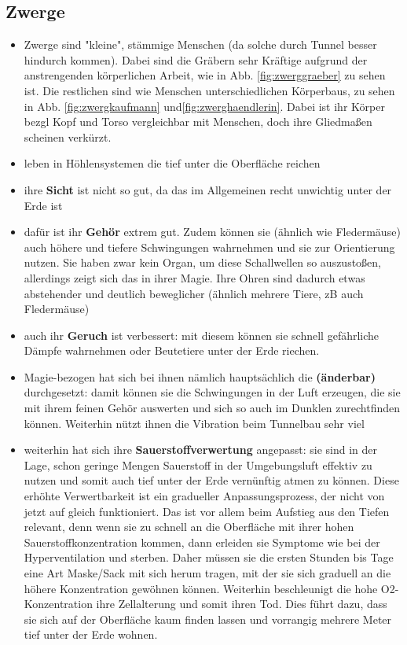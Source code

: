 \subsection{Zwerge} \label{rasse:zwerge}
\begin{itemize}
	\item  Zwerge sind "kleine", stämmige Menschen (da solche durch Tunnel besser hindurch kommen). Dabei sind die Gräbern sehr Kräftige aufgrund der anstrengenden körperlichen Arbeit, wie in Abb. \ref{fig:zwerggraeber} zu sehen ist. Die restlichen sind wie Menschen unterschiedlichen Körperbaus, zu sehen in Abb. \ref{fig:zwergkaufmann} und\ref{fig:zwerghaendlerin}. Dabei ist ihr Körper bezgl Kopf und Torso vergleichbar mit Menschen, doch ihre Gliedmaßen scheinen verkürzt.
	\item leben in Höhlensystemen die tief unter die Oberfläche reichen
	\item ihre \textbf{Sicht} ist nicht so gut, da das im Allgemeinen recht unwichtig unter der Erde ist
	\item dafür ist ihr \textbf{Gehör} extrem gut. Zudem können sie (ähnlich wie Fledermäuse) auch höhere und tiefere Schwingungen wahrnehmen und sie zur Orientierung nutzen. Sie haben zwar kein Organ, um diese Schallwellen so auszustoßen, allerdings zeigt sich das in ihrer Magie. Ihre Ohren sind dadurch etwas abstehender und deutlich beweglicher (ähnlich mehrere Tiere, zB auch Fledermäuse)
	\item auch ihr \textbf{Geruch} ist verbessert: mit diesem können sie schnell gefährliche Dämpfe wahrnehmen oder Beutetiere unter der Erde riechen.
	\item Magie-bezogen hat sich bei ihnen nämlich hauptsächlich die \textbf{ (änderbar)} durchgesetzt: damit können sie die Schwingungen in der Luft erzeugen, die sie mit ihrem feinen Gehör auswerten und sich so auch im Dunklen zurechtfinden können. Weiterhin nützt ihnen die Vibration beim Tunnelbau sehr viel
	\item weiterhin hat sich ihre \textbf{Sauerstoffverwertung} angepasst: sie sind in der Lage, schon geringe Mengen Sauerstoff in der Umgebungsluft effektiv zu nutzen und somit auch tief unter der Erde vernünftig atmen zu können. Diese erhöhte Verwertbarkeit ist ein gradueller Anpassungsprozess, der nicht von jetzt auf gleich funktioniert. Das ist vor allem beim Aufstieg aus den Tiefen relevant, denn wenn sie zu schnell an die Oberfläche mit ihrer hohen Sauerstoffkonzentration kommen, dann erleiden sie Symptome wie bei der Hyperventilation und sterben. Daher müssen sie die ersten Stunden bis Tage eine Art Maske/Sack mit sich herum tragen, mit der sie sich graduell an die höhere Konzentration gewöhnen können. Weiterhin beschleunigt die hohe O2-Konzentration ihre Zellalterung und somit ihren Tod. Dies führt dazu, dass sie sich auf der Oberfläche kaum finden lassen  und vorrangig mehrere Meter tief unter der Erde wohnen.
\end{itemize}


